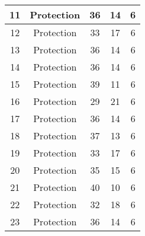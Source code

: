 \documentclass[results.tex]{subfiles}
\begin{document}
\begin{center}
\begin{tabular}{| c || c | c | c | c |}
            \hline
            11                      & Protection                   & 36                     & 14                      & 6                    \\
            \hline
            12                      & Protection                   & 33                     & 17                      & 6                    \\
            \hline
            13                      & Protection                   & 36                     & 14                      & 6                    \\
            \hline
            14                      & Protection                   & 36                     & 14                      & 6                    \\
            \hline
            15                      & Protection                   & 39                     & 11                      & 6                    \\
            \hline
            16                      & Protection                   & 29                     & 21                      & 6                    \\
            \hline
            17                      & Protection                   & 36                     & 14                      & 6                    \\
            \hline
            18                      & Protection                   & 37                     & 13                      & 6                    \\
            \hline
            19                      & Protection                   & 33                     & 17                      & 6                    \\
            \hline
            20                      & Protection                   & 35                     & 15                      & 6                    \\
            \hline
            21                      & Protection                   & 40                     & 10                      & 6                    \\
            \hline
            22                      & Protection                   & 32                     & 18                      & 6                    \\
            \hline
            23                      & Protection                   & 36                     & 14                      & 6                    \\

\end{tabular}
\end{center}
\end{document}
